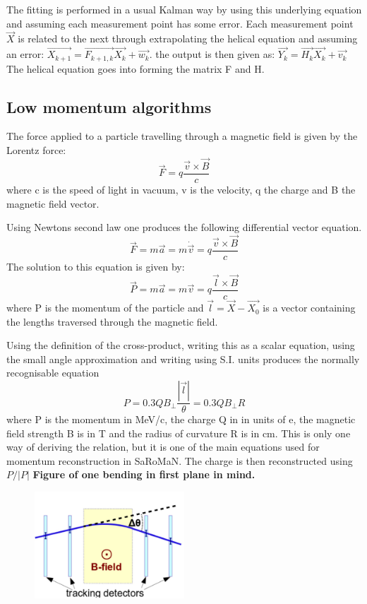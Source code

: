 The fitting is performed in a usual Kalman way by using this underlying equation and assuming each measurement point has some error.
Each measurement point $\vec{X}$ is related to the next through extrapolating the helical equation and assuming an error: $\vec{X_{k+1}} = \vec{F_{k+1,k}}\vec{X_k} + \vec{w_k}$. 
the output is then given as: $\vec{Y_{k}} = \vec{H_{k}}\vec{X_k} + \vec{v_k}$
The helical equation goes into forming the matrix F and H.

\subsection{Low momentum algorithms}
The force applied to a particle travelling through a magnetic field is given by the Lorentz force:
\begin{equation}
\vec{F}=q\frac{\vec{v}\times\vec{B}}{c}
\end{equation}
where c is the speed of light in vacuum, v is the velocity, q the charge and B the magnetic field vector.

Using Newtons second law one produces the following differential vector equation.
\begin{equation}
\vec{F}=m\vec{a}=m\dot{\vec{v}}=q\frac{\vec{v}\times\vec{B}}{c}
\end{equation}
The solution to this equation is given by:
\begin{equation}
\vec{P}=m\vec{a}=m\vec{v}=q\frac{\vec{l}\times\vec{B}}{c}
\end{equation} 
where P is the momentum of the particle and $\vec{l}=\vec{X}-\vec{X_0}$ is a vector containing the lengths traversed through the magnetic field.

Using the definition of the cross-product, writing this as a scalar equation, using the small angle approximation and writing using S.I. units produces the normally recognisable equation
\begin{equation}
P = 0.3 QB_\bot \frac{|\vec{l}|}{\theta}=0.3 QB_\bot R
\end{equation}
where P is the momentum in MeV/c, the charge Q in in units of e, the magnetic field strength B is in T and the radius of curvature R is in cm. This is only one way of deriving the relation, but it is one of the main equations used for momentum reconstruction in SaRoMaN. The charge is then reconstructed using $P/|P|$ \textbf{Figure of one bending in first plane in mind.}

\begin{figure}[h!]
\centering
\includegraphics[width=0.5\textwidth]{figures/lowP/scattering.jpeg}
\caption{}
\label{fig:Scattering}
\end{figure}


